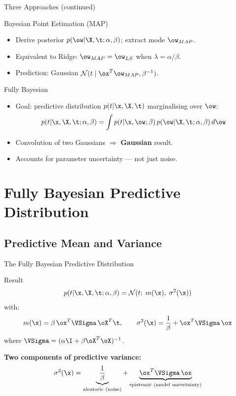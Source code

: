 \begin{frame}{Three Approaches (continued)}
  \begin{block}{Bayesian Point Estimation (MAP)}
    \begin{itemize}
      \item Derive posterior $p(\ow|\X,\t;\alpha,\beta)$; extract mode $\ow_{MAP}$.
      \item Equivalent to Ridge: $\ow_{MAP}=\ow_{LS}$ when $\lambda=\alpha/\beta$.
      \item Prediction: Gaussian $\mathcal{N}(t\mid\ox^T\ow_{MAP},\beta^{-1})$.
    \end{itemize}
  \end{block}
  \vspace{.3em}
  \begin{block}{Fully Bayesian}
    \begin{itemize}
      \item Goal: \alert{predictive distribution} $p(t|\x,\X,\t)$ marginalising over $\ow$:
      \[
        p(t|\x,\X,\t;\alpha,\beta) = \int p(t|\x,\ow;\beta)\,p(\ow|\X,\t;\alpha,\beta)\,d\ow
      \]
      \item Convolution of two Gaussians $\Rightarrow$ \textbf{Gaussian} result.
      \item Accounts for parameter uncertainty — not just noise.
    \end{itemize}
  \end{block}
\end{frame}

\section{Fully Bayesian Predictive Distribution}

\subsection{Predictive Mean and Variance}

\begin{frame}{The Fully Bayesian Predictive Distribution}
  \begin{block}{Result}
    \[
      p(t|\x,\X,\t;\alpha,\beta) = \mathcal{N}(t;\;m(\x),\;\sigma^2(\x))
    \]
    with:
    \[
      m(\x) = \beta\,\ox^T\VSigma\,\oX^T\t, \qquad
      \sigma^2(\x) = \frac{1}{\beta} + \ox^T\VSigma\,\ox
    \]
    where $\VSigma = (\alpha\I+\beta\oX^T\oX)^{-1}$.
  \end{block}
  \vspace{.3em}
  \textbf{Two components of predictive variance:}
  \[
    \sigma^2(\x) = \underbrace{\frac{1}{\beta}}_{\text{aleatoric (noise)}} + \underbrace{\ox^T\VSigma\,\ox}_{\text{epistemic (model uncertainty)}}
  \]
\end{frame}

